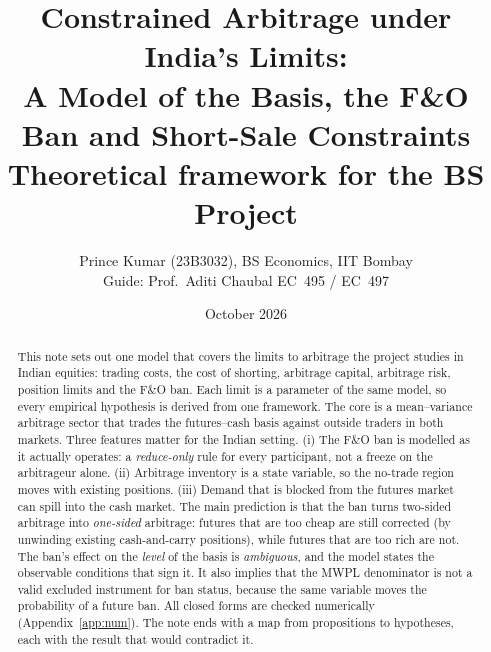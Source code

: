 \documentclass[11pt,a4paper]{article}
\title{\vspace{-1.2cm}\color{accent}\bfseries Constrained Arbitrage under India's Limits:\\ A Model of the Basis, the F\&O Ban and Short-Sale Constraints\\[0.25cm]
\large\mdseries\color{black} Theoretical framework for the BS Project}
\author{Prince Kumar (23B3032), BS Economics, IIT Bombay\\ \small Guide: Prof.\ Aditi Chaubal \quad\textbar\quad EC~495 / EC~497}
\date{October 2026}
\theoremstyle{plain}
\theoremstyle{definition}
\theoremstyle{remark}
\begin{document}
\maketitle
\thispagestyle{empty}

\begin{abstract}
\noindent This note sets out one model that covers the limits to arbitrage the project studies in Indian equities:
trading costs, the cost of shorting, arbitrage capital, arbitrage risk, position limits and the F\&O ban. Each limit is a
parameter of the same model, so every empirical hypothesis is derived from one framework. The core is a
mean--variance arbitrage sector that trades the futures--cash basis against outside traders in both markets. Three
features matter for the Indian setting. (i) The F\&O ban is modelled as it actually operates: a
\emph{reduce-only} rule for every participant, not a freeze on the arbitrageur alone. (ii) Arbitrage inventory is a state
variable, so the no-trade region moves with existing positions. (iii) Demand that is blocked from the futures market
can spill into the cash market. The main prediction is that the ban turns two-sided arbitrage into
\emph{one-sided} arbitrage: futures that are too cheap are still corrected (by unwinding existing cash-and-carry
positions), while futures that are too rich are not. The ban's effect on the \emph{level} of the basis is
\emph{ambiguous}, and the model states the observable conditions that sign it. It also implies that the MWPL
denominator is not a valid excluded instrument for ban status, because the same variable moves the probability of a
future ban. All closed forms are checked numerically (Appendix~\ref{app:num}). The note ends with a map from
propositions to hypotheses, each with the result that would contradict it.
\end{abstract}

\tableofcontents
\newpage

\end{document}
